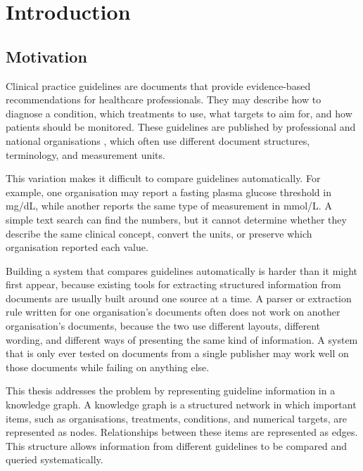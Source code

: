 \chapter{Introduction}
\label{chap:introduction}

\section{Motivation}
\label{sec:motivation}

Clinical practice guidelines are documents that provide evidence-based
recommendations for healthcare professionals. They may describe how to
diagnose a condition, which treatments to use, what targets to aim for, and
how patients should be monitored. These guidelines are published by professional and national organisations , which often use different document structures, terminology, and measurement units.

This variation makes it difficult to compare guidelines automatically. For
example, one organisation may report a fasting plasma glucose threshold in
mg/dL, while another reports the same type of measurement in mmol/L. A
simple text search can find the numbers, but it cannot determine whether
they describe the same clinical concept, convert the units, or preserve
which organisation reported each value.

Building a system that compares guidelines automatically is harder than it
might first appear, because existing tools for extracting structured
information from documents are usually built around one source at a time. A
parser or extraction rule written for one organisation's documents often
does not work on another organisation's documents, because the two use
different layouts, different wording, and different ways of presenting the
same kind of information. A system that is only ever tested on documents
from a single publisher may work well on those documents while failing on
anything else.

This thesis addresses the problem by representing guideline information in
a knowledge graph. A knowledge graph is a structured network in which
important items, such as organisations, treatments, conditions, and
numerical targets, are represented as nodes. Relationships between these
items are represented as edges. This structure allows information from
different guidelines to be compared and queried systematically.

